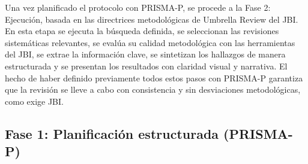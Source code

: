 Una vez planificado el protocolo con PRISMA-P, se procede a la Fase 2: 
Ejecución, basada en las directrices metodológicas de Umbrella Review del JBI. En esta etapa se ejecuta la búsqueda definida, se seleccionan las revisiones sistemáticas relevantes, se evalúa su calidad metodológica con las herramientas del JBI, se extrae la información clave, se sintetizan los hallazgos de manera estructurada y se presentan los resultados con claridad visual y narrativa. El hecho de haber definido previamente todos estos pasos con PRISMA-P garantiza que la revisión se lleve a cabo con consistencia y sin desviaciones metodológicas, como exige JBI.

\subsection*{Fase 1: Planificación estructurada (PRISMA-P)}

